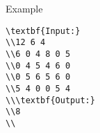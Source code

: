 Example
\begin{verbatim}
\textbf{Input:}
\\12 6 4
\\6 0 4 8 0 5
\\0 4 5 4 6 0
\\0 5 6 5 6 0
\\5 4 0 0 5 4
\\\textbf{Output:}
\\8
\\\end{verbatim}